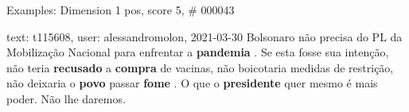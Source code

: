 \begin{frame}{Examples: Dimension 1 pos, score 5, \# 000043}
\footnotesize
\begin{exampleblock}{text: t115608, user: alessandromolon, 2021-03-30}
Bolsonaro não precisa do PL da Mobilização Nacional para enfrentar a 
\textbf{pandemia} . Se esta fosse sua intenção, não teria \textbf{recusado} a 
\textbf{compra} de vacinas, não boicotaria medidas de restrição, não deixaria o 
\textbf{povo} passar \textbf{fome} . O que o \textbf{presidente} quer mesmo é 
mais poder. Não lhe daremos. 
\end{exampleblock}
\end{frame}
